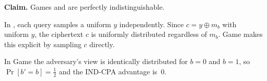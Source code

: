 \textbf{Claim.}
  Games  and  are perfectly indistinguishable.

In , each query samples a uniform $y$ independently.
Since $c = y \oplus m_b$ with uniform $y$, the ciphertext $c$ is
uniformly distributed regardless of $m_b$.
Game  makes this explicit by sampling $c$ directly.

In Game  the adversary's view is identically distributed for $b = 0$ and $b = 1$,
so $\Pr[b' = b] = \tfrac{1}{2}$ and the IND-CPA advantage is~$0$.
